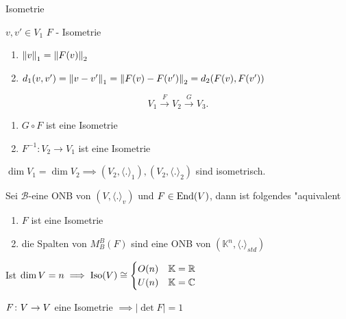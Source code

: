 \documentclass[class=article, crop=false]{standalone}
\begin{document}
\begin{zettel}{Isometrie}
\begin{remark}
	$v,v' \in  V_1$ $F$ - Isometrie
	\begin{enumerate}
		\item $ \left\|v\right\|_1 = \left\|F(v)\right\|_2$
		\item $d_1 (v,v') = \left\|v-v'\right\|_1 = \left\|F(v)-F(v')\right\|_2 = d_2 (F(v),F(v'))$
	\end{enumerate}
\end{remark}

\begin{remark}
	\[
		V_1 \stackrel{F}{\to} V_2 \stackrel{G}{\to} V_3
	.\]
	\begin{enumerate}
		\item $G \circ  F$ ist eine Isometrie
		\item $F^{-1}: V_2 \to  V_1$ ist eine Isometrie
	\end{enumerate}
\end{remark}

\begin{corollary}
	$\dim V_1 = \dim V_2 \implies  (V_2, \langle .\rangle_1), (V_2, \langle .\rangle_2)$  sind isometrisch.
\end{corollary}

\begin{theorem}[7.5]
	Sei $\mathcal{B}$-eine ONB von $(V, \langle .\rangle_v)$ und $F \in  \operatorname{End}(V)$, dann ist folgendes "aquivalent
	\begin{enumerate}
		\item $F$ ist eine Isometrie
		\item die Spalten von $M_B^B (F) $ sind eine ONB von $( \mathbb{K}^n, \langle .\rangle_{std})$
	\end{enumerate}
\end{theorem}

\begin{corollary}
	Ist $\dim V =n \implies \operatorname{Iso} (V) \cong \begin{cases} O (n) & \mathbb{K} = \mathbb{R} \\ U (n) & \mathbb{K} = \mathbb{C} \end{cases} $
\end{corollary}

\begin{corollary}
	$F \colon V\to V$ eine Isometrie $\implies |\det F| =1$
\end{corollary}


\end{zettel}
\end{document}
